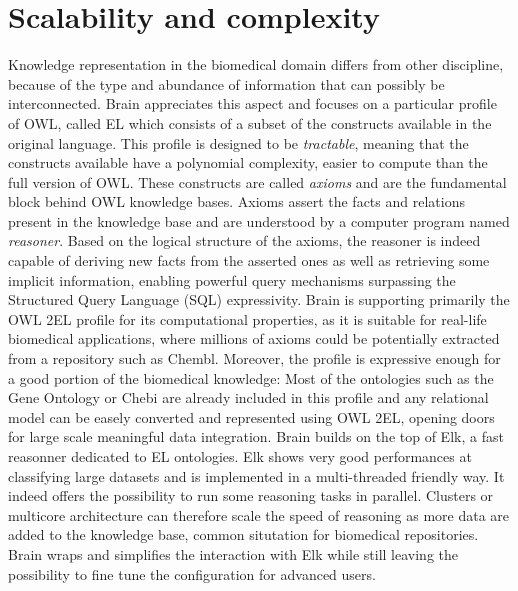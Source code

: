 \documentclass{bioinfo}
\begin{document}
\section{Scalability and complexity}
Knowledge representation in the biomedical domain differs from other discipline, because of the type and abundance of
information that can possibly be interconnected. Brain appreciates this aspect and focuses on a particular profile of OWL, called EL
which consists of a subset of the constructs available in the original language. This profile is
designed to be \emph{tractable}, meaning that the constructs available have a polynomial complexity, easier to compute than the full 
version of OWL. 
These constructs are called \emph{axioms} and are the fundamental block behind OWL knowledge bases.
Axioms assert the facts and relations present in the knowledge base and are understood by a computer program named \emph{reasoner}. 
Based on the logical structure of the axioms, the reasoner is indeed capable of deriving new facts from the asserted ones as well as retrieving
some implicit information, enabling powerful query mechanisms surpassing the Structured Query Language (SQL) expressivity. 
Brain is supporting primarily the OWL 2EL profile for its computational properties, as it is suitable for real-life biomedical applications, 
where millions of axioms could be potentially extracted from a repository such as Chembl.
Moreover, the profile is expressive enough for a good portion of the biomedical knowledge: Most of the ontologies such as the Gene Ontology or 
Chebi are already included in this profile and any relational model can be easely converted and represented using OWL 2EL, opening doors
for large scale meaningful data integration.
Brain builds on the top of Elk, a fast reasonner dedicated to EL ontologies. Elk shows very good performances at classifying 
large datasets and is implemented in a multi-threaded friendly way. It indeed offers the possibility to run some reasoning tasks in parallel.
Clusters or multicore architecture can therefore scale the speed of reasoning as more data are added to the knowledge base, common
situtation for biomedical repositories. Brain wraps and simplifies the interaction with Elk while still leaving the possibility to fine tune 
the configuration for advanced users.
\end{document}
